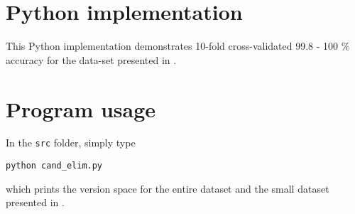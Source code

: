 \newpage

\section{Python implementation}

This Python implementation demonstrates 10-fold cross-validated 99.8 - 100 \% accuracy for the data-set presented in \cite{mitchell}.


\section{Program usage}

In the \texttt{src} folder, simply type

\centerline{\texttt{python cand\_elim.py}}

\vspace{2mm}
\noindent which prints the version space for the entire dataset and the small dataset presented in \cite{mitchell}.

